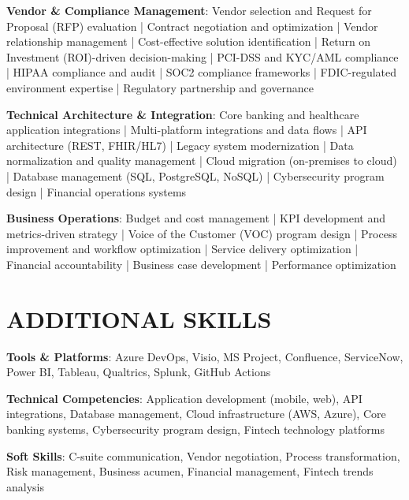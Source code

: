 \documentclass[10pt]{article}
\begin{document}
\vspace{0.08in}
\noindent
\textbf{Vendor \& Compliance Management}: Vendor selection and Request for Proposal (RFP) evaluation | Contract negotiation and optimization | Vendor relationship management | Cost-effective solution identification | Return on Investment (ROI)-driven decision-making | PCI-DSS and KYC/AML compliance | HIPAA compliance and audit | SOC2 compliance frameworks | FDIC-regulated environment expertise | Regulatory partnership and governance

\vspace{0.08in}
\noindent
\textbf{Technical Architecture \& Integration}: Core banking and healthcare application integrations | Multi-platform integrations and data flows | API architecture (REST, FHIR/HL7) | Legacy system modernization | Data normalization and quality management | Cloud migration (on-premises to cloud) | Database management (SQL, PostgreSQL, NoSQL) | Cybersecurity program design | Financial operations systems

\vspace{0.08in}
\noindent
\textbf{Business Operations}: Budget and cost management | KPI development and metrics-driven strategy | Voice of the Customer (VOC) program design | Process improvement and workflow optimization | Service delivery optimization | Financial accountability | Business case development | Performance optimization

\section*{ADDITIONAL SKILLS}

\noindent
\textbf{Tools \& Platforms}: Azure DevOps, Visio, MS Project, Confluence, ServiceNow, Power BI, Tableau, Qualtrics, Splunk, GitHub Actions

\vspace{0.08in}
\noindent
\textbf{Technical Competencies}: Application development (mobile, web), API integrations, Database management, Cloud infrastructure (AWS, Azure), Core banking systems, Cybersecurity program design, Fintech technology platforms

\vspace{0.08in}
\noindent
\textbf{Soft Skills}: C-suite communication, Vendor negotiation, Process transformation, Risk management, Business acumen, Financial management, Fintech trends analysis
\end{document}
